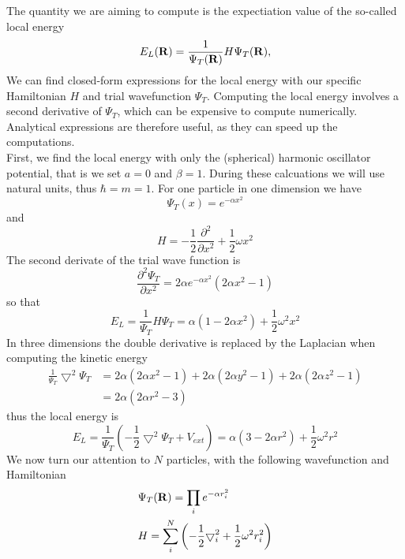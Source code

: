 \documentclass[english, a4paper]{article}
\begin{document}
The quantity we are aiming to compute is the expectiation value of the so-called local energy
 \begin{equation}
    E_L({\bf R})=\frac{1}{\Psi_T({\bf R})}H\Psi_T({\bf R}),
    \label{localenergy}
 \end{equation}
We can find closed-form expressions for the local energy with our specific Hamiltonian $H$ and trial wavefunction $\Psi_T$.
Computing the local energy involves a second derivative of $\Psi_T$, which can be expensive to compute numerically. 
Analytical expressions are therefore useful, as they can speed up the computations.\\

\noindent First, we find the local energy with only the (spherical) harmonic oscillator potential, that is we set $a=0$ and $\beta=1$.
During these calcuations we will use natural units, thus $\hbar=m=1$.
For one particle in one dimension we have
\begin{equation}
\Psi_T(x) = e^{-\alpha x^2}
\end{equation}
and
\begin{equation}
    H =  
	 -\frac{1}{2}
	 \frac{\partial^2}{\partial x^2} +
	 \frac{1}{2}\omega x^2
\end{equation}
The second derivate of the trial wave function is
\begin{equation}
 \frac{\partial^2 \Psi_T}{\partial x^2} = 2\alpha e^{-\alpha x^2}(2\alpha x^2 - 1)
\end{equation}
so that
\begin{equation}
 E_L = \frac{1}{\Psi_T}H\Psi_T = \alpha(1 - 2\alpha x^2) + \frac{1}{2}\omega^2x^2
\end{equation}
In three dimensions the double derivative is replaced by the Laplacian when computing the kinetic energy
\begin{align}
 \frac{1}{\Psi_T}\bigtriangledown^2\Psi_T &= 2\alpha(2\alpha x^2 - 1) + 2\alpha(2\alpha y^2 - 1) + 2\alpha(2\alpha z^2 - 1) \\
                          &= 2\alpha(2\alpha r^2 - 3) \label{analytickinnoninteracing}
\end{align}
thus the local energy is
\begin{equation}
 E_L = \frac{1}{\Psi_T}\left(-\frac{1}{2}\bigtriangledown^2\Psi_T + V_{ext}\right) = \alpha(3 - 2\alpha r^2) + 
 \frac{1}{2}\omega^2r^2 
\end{equation}
We now turn our attention to $N$ particles, with the following wavefunction and Hamiltonian
\begin{align}
 &\Psi_T({\bf R}) = \prod_i e^{-\alpha r_i^2} \\ \label{wfsystem1}
 &H =     \sum_i^N \left(
	 -\frac{1}{2}
	 { \bigtriangledown }_{i}^2 +
	 \frac{1}{2}\omega^2r_i^2 \right)
\end{align}
\end{document}
